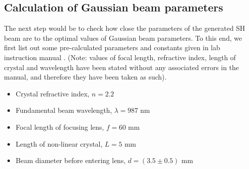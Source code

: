\subsection{Calculation of Gaussian beam parameters}
The next step would be to check how close the parameters of the generated SH beam are to the optimal values of Gaussian beam parameters. To this end, we first list out some pre-calculated parameters and constants given in lab instruction manual \cite{UB}. (Note: values of focal length, refractive index, length of crystal and wavelength have been stated without any associated errors in the manual, and therefore they have been taken as such). 
\begin{itemize}
\item Crystal refractive index, $n=2.2$
\item Fundamental beam wavelength, $\lambda=987$ nm
\item Focal length of focusing lens, $f=60$ mm
\item Length of non-linear crystal, $L=5$ mm
\item Beam diameter before entering lens, $d=(3.5\pm 0.5)$ mm 
\end{itemize}

